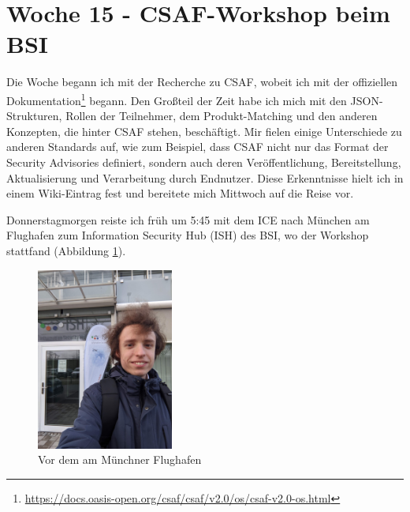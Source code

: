 \section{Woche 15 - CSAF-Workshop beim BSI} \label{sec:bericht-wo-15}


\lweekdaymarginpar{\weekdayMondayShort, \weekdayTuesdayShort, \weekdayWednesdayShort}

Die Woche begann ich mit der Recherche zu CSAF, wobeit ich mit der offiziellen Dokumentation\footnote{\url{https://docs.oasis-open.org/csaf/csaf/v2.0/os/csaf-v2.0-os.html}} begann.
Den Großteil der Zeit habe ich mich mit den JSON-Strukturen, Rollen der Teilnehmer, dem Produkt-Matching und den anderen Konzepten, die hinter CSAF stehen, beschäftigt.
Mir fielen einige Unterschiede zu anderen Standards auf, wie zum Beispiel, dass CSAF nicht nur das Format der Security Advisories definiert, sondern auch deren Veröffentlichung, Bereitstellung, Aktualisierung und Verarbeitung durch Endnutzer.
Diese Erkenntnisse hielt ich in einem Wiki-Eintrag fest und bereitete mich Mittwoch auf die Reise vor.

\sweekdaymarginpar{\weekdayThursdayLong}

Donnerstagmorgen reiste ich früh um 5:45 mit dem ICE nach München am Flughafen zum Information Security Hub (ISH) des BSI, wo der Workshop stattfand (Abbildung \ref{fig:yan-ish-csaf-muenchen}).

\begin{figure}[htbp] %
    \centering
    \includegraphics[width=0.4\textwidth, keepaspectratio]{res/img/2023-12-14-yan-vor-dem-ish-muenchen}
    \caption{Vor dem  am Münchner Flughafen}
    \label{fig:yan-ish-csaf-muenchen}
\end{figure}

